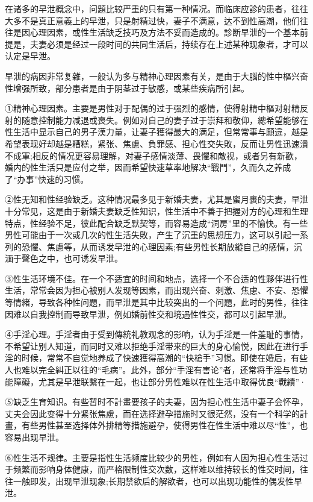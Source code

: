 \documentclass[12pt,UTF8]{ctexbook}
\begin{document}
在诸多的早泄概念中，问題比较严重的只有第一种情况。而临床应診的患者，往往大多不是真正意義上的早泄，只是射精过快，妻子不满意，达不到性高潮，他们往往是因心理因素，或性生活缺乏技巧及方法不妥而造成的。診断早泄的一个基本前提是，夫妻必须是经过一段时间的共同生活后，持续存在上述某种现象者，才可以认定是早泄。

早泄的病因非常复雜，一般认为多与精神心理因素有关，是由于大腦的性中樞兴奋性增强所致，部分患者是由于阴茎过于敏感，或某些疾病所引起。

①精神心理因素。主要是男性对于配偶的过于强烈的感情，使得射精中樞对射精反射的随意控制能力减退或喪失。例如对自己的妻子过于崇拜和敬仰，總希望能够在性生活中显示自己的男子漢力量，让妻子獲得最大的满足，但常常事与願違，越是希望表现好却越是糟糕，紧张、焦慮、負罪感、担心性交失敗，反而让男性迅速潰不成軍;相反的情况更容易理解，对妻子感情淡薄、畏懼和敵视，或者另有新歡，婚内的性生活只是应付之举，因而希望快速草率地解决“戰鬥”，久而久之养成了“办事”快速的习惯。

②性无知和性经验缺乏。这种情况最多见于新婚夫妻，尤其是蜜月裹的夫妻，早泄十分常见，这是由于新婚夫妻缺乏性知识，性生活中不善于把握对方的心理和生理特点，性经验不足，彼此配合缺乏默契等，而容易造成“洞房”里的不愉快。有一些男性可能由于一次或几次的性生活失敗，产生了沉重的思想压力，这可以引起一系列的恐懼、焦慮等，从而诱发早泄的心理因素;有些男性长期放縱自己的感情，沉湎于聲色之中，也可诱发早泄。

③性生活环境不佳。在一个不适宜的时间和地点，选择一个不合适的性夥伴进行性生活，常常会因为担心被别人发现等因素，而出现兴奋、刺激、焦慮、不安、恐懼等情緒，导致各种性问題，而早泄是其中比较突出的一个问題，此时的男性，往往因难以自我控制而导致早泄，例如婚前性交和境遇性性交，都可以引起早泄。

④手淫心理。手淫者由于受到傳統礼教观念的影响，认为手淫是一件羞耻的事情，不希望让别人知道，而同时又难以拒绝手淫带来的巨大的身心愉悦，因此在进行手淫的时候，常常不自觉地养成了快速獲得高潮的“快槍手”习惯。即使在婚后，有些人也难以完全糾正以往的“毛病”。此外，部分“手淫有害论”者，还常将手淫与性功能障礙，尤其是早泄联繫在一起，也让部分男性难以在性生活中取得优良“戰績”·

⑤缺乏生育知识。有些暂时不計畫要孩子的夫妻，因为担心性生活中妻子会怀孕，丈夫会因此变得十分紧张焦慮，而在选择避孕措施时又很茫然，没有一个科学的計畫，有些男性甚至选择体外排精等措施避孕，使得男性在性生活中难以尽“性”，也容易出现早泄。

⑥性生活不规律。主要是指性生活频度比较少的男性，例如有人因为担心性生活过于频繁而影响身体健康，而严格限制性交次数，这样难以维持较长的性交时间，往往一触即发，出现早泄现象;长期禁欲后的解欲者，也可以出现功能性的偶发性早泄。
\end{document}
